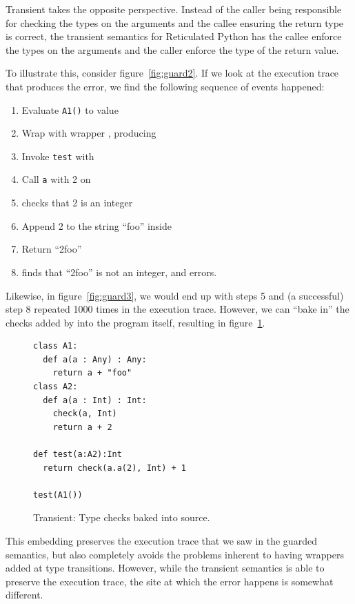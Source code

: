 \documentclass[a4paper,USenglish]{tex/lipics-v2016}
\begin{document}
Transient takes the opposite perspective. Instead of the caller being
responsible for checking the types on the arguments and the callee ensuring
the return type is correct, the transient semantics for Reticulated Python
has the callee enforce the types on the arguments and the caller enforce the
type of the return value.

To illustrate this, consider figure~\ref{fig:guard2}. If we look at the
execution trace that produces the error, we find the following sequence of
events happened:
\begin{enumerate}
\item Evaluate \verb|A1()| to value 
\item Wrap  with wrapper , producing 
\item Invoke \verb|test| with 
\item Call \verb|a| with 2 on 
\item {} checks that 2 is an integer
\item Append 2 to the string ``foo'' inside 
\item Return ``2foo'' 
\item {} finds that ``2foo'' is not an integer, and errors.
\end{enumerate}

Likewise, in figure~\ref{fig:guard3}, we would end up with steps 5 and (a
successful) step 8 repeated 1000 times in the execution trace. However, we
can ``bake in'' the checks added by  into the program itself,
resulting in figure~\ref{fig:trans1}.

\begin{figure}[h]
\begin{verbatim}
class A1:
  def a(a : Any) : Any:
    return a + "foo"
class A2:
  def a(a : Int) : Int:
    check(a, Int)
    return a + 2

def test(a:A2):Int
  return check(a.a(2), Int) + 1

test(A1())
\end{verbatim}
\caption{Transient: Type checks baked into source.}
\label{fig:trans1}
\end{figure}

This embedding preserves the execution trace that we saw in the guarded
semantics, but also completely avoids the problems inherent to having
wrappers added at type transitions. However, while the transient semantics
is able to preserve the execution trace, the site at which the error happens
is somewhat different.
\end{document}
